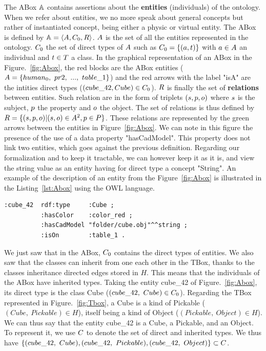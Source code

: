 The ABox $\mathbb{A}$ contains assertions about the \textbf{entities} (individuals) of the ontology. When we refer about entities, we no more speak about general concepts but rather of instantiated concept, being either a physic or virtual entity. The ABox is defined by $\mathbb{A} = \langle A, C_0, R \rangle$. $A$ is the set of all the entities represented in the ontology. $C_0$ the set of direct types of $A$ such as $C_0 = \{(a, t) \}$ with $a \in A$ an individual and $t \in T$ a class. In the graphical representation of an ABox in the Figure.~\ref{fig:Abox}, the red blocks are the ABox entities ($\indivset = \{human_0,\ pr2,\ ...,\ table\_1\}$) and the red arrows with the label "isA" are the intities direct types ($(cube\_42, Cube) \in C_0$).
$R$ is finally the set of \textbf{relations} between entities. Such relation are in the form of triplets $(s, p ,o)$ where $s$ is the subject, $p$ the property and $o$ the object. The set of relations is thus defined by $R = \{(s, p ,o) | (s, o) \in A^2, p \in P\}$. These relations are represented by the green arrows between the entities in Figure~\ref{fig:Abox}. We can note in this figure the presence of the use of a data property "hasCadModel". This property does not link two entities, which goes against the previous definition. Regarding our formalization and to keep it tractable, we can however keep it as it is, and view the string value as an entity having for direct type a concept "String". An example of the description of an entity from the Figure~\ref{fig:Abox} is illustrated in the Listing~\ref{lst:Abox} using the OWL language.

\begin{lstlisting}[frame=single, basicstyle=\scriptsize\ttfamily, label={lst:Abox}, caption={Description of an ontology individual in the OWL language using the Turle syntax.},captionpos=b, style=OwlTurtle_indiv]
:cube_42  rdf:type     :Cube ;
          :hasColor    :color_red ;
          :hasCadModel "folder/cube.obj"^^string ;
          :isOn        :table_1 .
\end{lstlisting}


We just saw that in the ABox, $C_0$ contains the direct types of entities. We also saw that the classes can inherit from one each other in the TBox, thanks to the classes inheritance directed edges stored in $H$. This means that the individuals of the ABox have inherited types. Taking the entity cube\_42 of Figure.~\ref{fig:Abox}, its direct type is the class Cube ($(cube\_42,\ Cube) \in \inheritset_0$). Regarding the TBox represented in Figure.~\ref{fig:Tbox}, a Cube is a kind of Pickable ($(Cube,\ Pickable) \in H$), itself being a kind of Object ($(Pickable,\ Object) \in H$). We can thus say that the entity cube\_42 is a Cube, a Pickable, and an Object. To represent it, we use $C$ to denote the set of direct and inherited types. We thus have $\{ (cube\_42,\ Cube), (cube\_42,\ Pickable), (cube\_42,\ Object)\} \subset \inheritset$.

